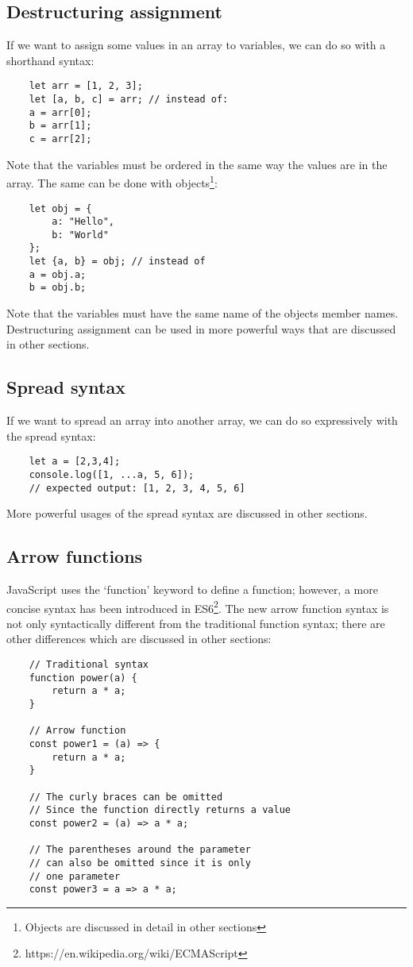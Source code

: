 \documentclass[11pt,a4paper]{article}
\begin{document}
\subsection{Destructuring assignment}
If we want to assign some values in an array to variables, we can do so with a shorthand syntax:
\begin{verbatim}
    let arr = [1, 2, 3];
    let [a, b, c] = arr; // instead of:
    a = arr[0];
    b = arr[1];
    c = arr[2];
\end{verbatim}
Note that the variables must be ordered in the same way the values are in the array.
The same can be done with objects\footnote{Objects are discussed in detail in other sections}:
\begin{verbatim}
    let obj = {
        a: "Hello",
        b: "World"
    };
    let {a, b} = obj; // instead of
    a = obj.a;
    b = obj.b;
\end{verbatim}
Note that the variables must have the same name of the objects member names. Destructuring assignment can be used in more
powerful ways that are discussed in other sections.

\subsection{\label{spread_syntax}Spread syntax}
If we want to spread an array into another array, we can do so expressively with the spread syntax:
\begin{verbatim}
    let a = [2,3,4];
    console.log([1, ...a, 5, 6]);
    // expected output: [1, 2, 3, 4, 5, 6]
\end{verbatim}
More powerful usages of the spread syntax are discussed in other sections.

\subsection{\label{arrow_functions}Arrow functions}
JavaScript uses the `function' keyword to define a function; however, a more concise syntax has been introduced in
ES6\footnote{https://en.wikipedia.org/wiki/ECMAScript}. The new arrow function syntax is not only syntactically
different from the traditional function syntax; there are other differences which are discussed in other sections:
\begin{verbatim}
    // Traditional syntax
    function power(a) {
        return a * a;
    }

    // Arrow function
    const power1 = (a) => {
        return a * a;
    }

    // The curly braces can be omitted
    // Since the function directly returns a value
    const power2 = (a) => a * a;

    // The parentheses around the parameter
    // can also be omitted since it is only
    // one parameter
    const power3 = a => a * a;
\end{verbatim}
\end{document}
